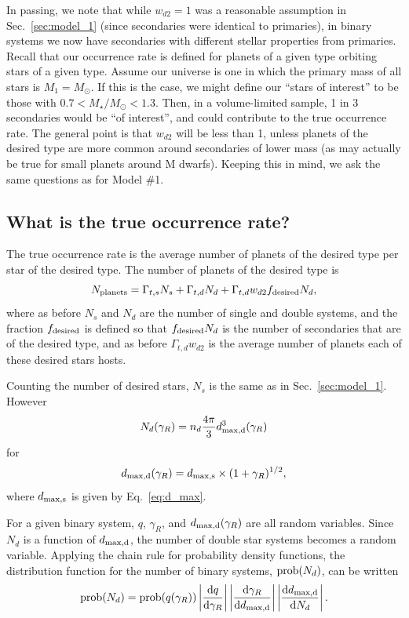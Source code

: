 \documentclass{emulateapj}
\begin{document}
In passing, we note that while $w_{d2}=1$ was a reasonable assumption in 
Sec.~\ref{sec:model_1} (since secondaries were identical to primaries), in 
binary systems we now have secondaries with different stellar properties from 
primaries.
Recall that our occurrence rate is defined for planets of a given type 
orbiting stars of a given type.
Assume our universe is one in which the primary mass of all stars is 
$M_1=M_\odot$.
If this is the case, we might define our ``stars of interest'' to be 
those with $0.7<M_\star/M_\odot<1.3$.
Then, in a volume-limited sample, 1 in 3 secondaries would be ``of interest'', 
and could contribute to the true occurrence rate.
The general point is that $w_{d2}$ will be less than 1, unless planets of the 
desired type are more common around secondaries of lower mass (as may actually 
be true for small planets around M dwarfs).
Keeping this in mind, we ask the same questions as for Model \#1.

\subsection{What is the true occurrence rate?}

The true occurrence rate is the average number of planets of the desired type 
per star of the desired type.
The number of planets of the desired type is
\begin{equation}
N_{\rm planets} = \Gamma_{t,s}N_s + \Gamma_{t,d}N_d + 
\Gamma_{t,d}w_{d2}f_{{\rm desired}}N_d,
\end{equation}
where as before $N_s$ and $N_d$ are the number of single and double systems, 
and the fraction $f_{{\rm desired}}$ is defined so that $f_{{\rm desired}} 
N_d$ is the number of secondaries that are of the desired type, and as before 
$\Gamma_{t,d}w_{d2}$ is the average number of planets each of these desired 
stars hosts.

Counting the number of desired stars, $N_s$ is the same as in 
Sec.~\ref{sec:model_1}. However
\begin{equation}
N_d(\gamma_R) = n_d \frac{4\pi}{3} d_{\rm max,d}^3(\gamma_R)
\end{equation}
for
\begin{equation}
d_{\rm max,d}(\gamma_R) =
d_{\rm max,s}\times (1+\gamma_R)^{1/2},
\end{equation}
where $d_{\rm max,s}$ is given by Eq.~\ref{eq:d_max}.

For a given binary system, $q$, $\gamma_R$, and $d_{\rm 
	max,d}(\gamma_R)$ are all random variables.
Since $N_d$ is a function of $d_{\rm max,d}$, 
the number of double star systems becomes a random variable.
Applying the chain rule for probability density functions, the distribution 
function for the number of binary systems,
${\rm prob}(N_d)$, can be written 
\begin{equation}
{\rm prob}(N_d) = {\rm prob}(q(\gamma_R)) 
\left| \frac{{\rm d}q}{{\rm d}\gamma_R}  \right|
\left| \frac{{\rm d}\gamma_R}{{\rm d}d_{\rm max,d}}  \right|				
\left| \frac{{\rm d}d_{\rm max,d}}{{\rm d}N_d}  \right|.
\end{equation}
\end{document}
